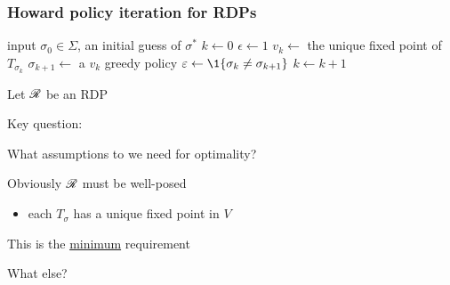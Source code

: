 \documentclass[dvipsnames]{beamer}
\begin{document}
\begin{frame}[fragile]
    \frametitle{Howard policy iteration for RDPs}
    

    \begin{algorithm}[H]
        \DontPrintSemicolon
        input $\sigma_0 \in \Sigma$, an initial guess of $\sigma^*$ \;
        $k \leftarrow 0$ \;
        $\epsilon \leftarrow 1$ \;
        {
            $v_k \leftarrow$ the unique fixed point of $T_{\sigma_k}$ \;
            $\sigma_{k+1} \leftarrow $ a $v_k$ greedy policy \;
            $\epsilon \leftarrow \1\{ \sigma_k \not= \sigma_{k+1} \}$ \;
            $k \leftarrow k + 1$ \;
        }
    \end{algorithm}

\end{frame}


\begin{frame}
    
    Let $\mathscr R$ be an RDP

    \vspace{0.5em}
    Key question:

    \vspace{0.5em}
    What assumptions to we need for optimality?

    \vspace{0.5em}
    Obviously $\mathscr R$ must be well-posed

    \begin{itemize}
        \item each $T_\sigma$ has a unique fixed point in $V$
    \end{itemize}


    \vspace{0.5em}
    This is the \underline{minimum} requirement

    \vspace{0.5em}
    \vspace{0.5em}

    What else?

\end{frame}
\end{document}
